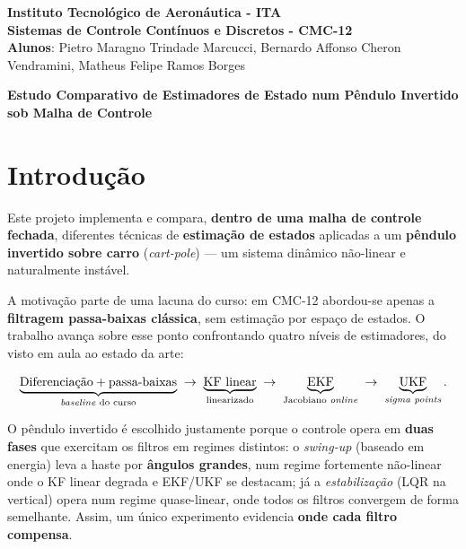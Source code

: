 \documentclass[brazil, 12pt]{article}
\begin{document}

\begin{center}
\textbf{Instituto Tecnológico de Aeronáutica - ITA} \\
\textbf{Sistemas de Controle Contínuos e Discretos - CMC-12} \\
\textbf{Alunos}: Pietro Maragno Trindade Marcucci, Bernardo Affonso Cheron Vendramini, Matheus Felipe Ramos Borges
\end{center}

\begin{center}
\textbf{Estudo Comparativo de Estimadores de Estado num Pêndulo Invertido sob
Malha de Controle}
\end{center}
\vspace*{0.5cm}

\section{Introdução}

Este projeto implementa e compara, \textbf{dentro de uma malha de controle
fechada}, diferentes técnicas de \textbf{estimação de estados} aplicadas a um
\textbf{pêndulo invertido sobre carro} (\emph{cart-pole}) --- um sistema
dinâmico não-linear e naturalmente instável.

A motivação parte de uma lacuna do curso: em CMC-12 abordou-se apenas a
\textbf{filtragem passa-baixas clássica}, sem estimação por espaço de estados.
O trabalho avança sobre esse ponto confrontando quatro níveis de estimadores, do
visto em aula ao estado da arte:

\[
\underbrace{\text{Diferenciação} + \text{passa-baixas}}_{\text{\emph{baseline} do curso}}
\;\rightarrow\;
\underbrace{\text{KF linear}}_{\text{linearizado}}
\;\rightarrow\;
\underbrace{\text{EKF}}_{\text{Jacobiano \emph{online}}}
\;\rightarrow\;
\underbrace{\text{UKF}}_{\text{\emph{sigma points}}}.
\]

O pêndulo invertido é escolhido justamente porque o controle opera em
\textbf{duas fases} que exercitam os filtros em regimes distintos: o
\emph{swing-up} (baseado em energia) leva a haste por \textbf{ângulos grandes},
num regime fortemente não-linear onde o KF linear degrada e EKF/UKF se destacam;
já a \emph{estabilização} (LQR na vertical) opera num regime quase-linear, onde
todos os filtros convergem de forma semelhante. Assim, um único experimento
evidencia \textbf{onde cada filtro compensa}.
\end{document}
